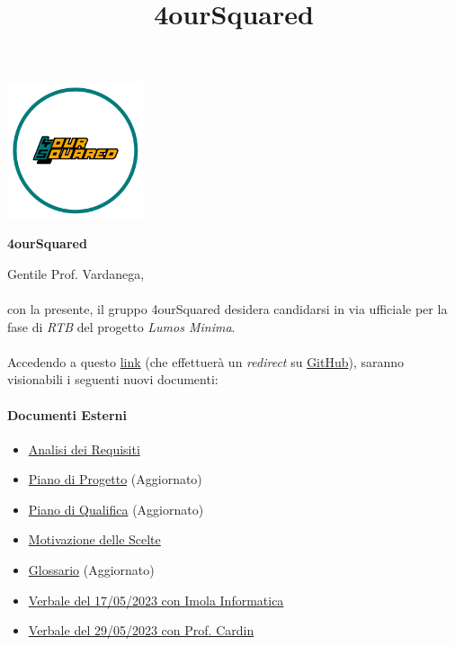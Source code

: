 \documentclass[12pt, a4paper]{article}
\begin{document}
\graphicspath{ {../../template} }
\title{4ourSquared}
\begin{center}
    \includegraphics[width=0.30\textwidth]{4ourSquared_logo}
\end{center}
\begin{center}
    {\Large \textbf{4ourSquared}}\\[24pt]
\end{center}


Gentile Prof. Vardanega,\\\\
con la presente, il gruppo 4ourSquared desidera candidarsi in via ufficiale per la fase di \textit{RTB} del progetto \textit{Lumos Minima}.\\\\
Accedendo a questo \href{https://github.com/4ourSquared/LumosMinima/tree/main/public}{link} (che effettuerà un \textit{redirect} su \href{https://github.com/}{GitHub}), saranno visionabili i seguenti nuovi documenti:
\paragraph{Documenti Esterni}
\begin{itemize}
    \item \href{https://github.com/4ourSquared/LumosMinima/tree/main/public/esterni/analisi_dei_requisiti.pdf}{Analisi dei Requisiti}
    \item \href{https://github.com/4ourSquared/LumosMinima/tree/main/public/esterni/piano_di_progetto.pdf}{Piano di Progetto} (Aggiornato)
    \item \href{https://github.com/4ourSquared/LumosMinima/tree/main/public/esterni/piano_di_qualifica.pdf}{Piano di Qualifica} (Aggiornato)
    \item \href{https://github.com/4ourSquared/LumosMinima/tree/main/public/esterni/motivazione_scelte.pdf}{Motivazione delle Scelte}
    \item \href{https://github.com/4ourSquared/LumosMinima/tree/main/public/esterni/gloassario.pdf}{Glossario} (Aggiornato)
    \item \href{https://github.com/4ourSquared/LumosMinima/tree/main/public/esterni/verbali/2023_05_17_E.pdf}{Verbale del 17/05/2023 con Imola Informatica}
    \item \href{https://github.com/4ourSquared/LumosMinima/tree/main/public/esterni/verbali/2023_05_29_E.pdf}{Verbale del 29/05/2023 con Prof. Cardin}
\end{itemize}
\end{document}

